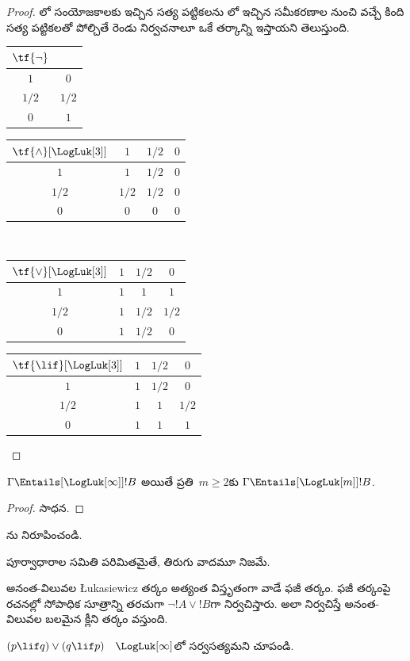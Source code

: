 \documentclass[../../../include/open-logic-section]{subfiles}
\begin{document}
\begin{proof}
  లో
   సంయోజకాలకు ఇచ్చిన సత్య పట్టికలను
   లో ఇచ్చిన సమీకరణాల నుంచి వచ్చే
   కింది సత్య పట్టికలతో పోల్చితే రెండు నిర్వచనాలూ ఒకే తర్కాన్ని ఇస్తాయని తెలుస్తుంది.
  \begin{center}
    \begin{tabular}{c|c}
      $\tf{\lnot}$ & \\
      \hline
      $1$ & $0$ \\
      $1/2$ & $1/2$ \\
      $0$ & $1$
    \end{tabular}
    \quad
    \begin{tabular}{c|ccc}
      $\tf{\land}[\LogLuk[3]]$ & $1$ & $1/2$ & $0$ \\
      \hline
      $1$ & $1$ & $1/2$ & $0$ \\
      $1/2$ & $1/2$ & $1/2$ & $0$\\
      $0$ & $0$ & $0$ & $0$
    \end{tabular}
    \\[2ex]
    \begin{tabular}{c|ccc}
      $\tf{\lor}[\LogLuk[3]]$ & $1$ & $1/2$ & $0$ \\
      \hline
      $1$ & $1$ & $1$ & $1$ \\
      $1/2$ & $1$ & $1/2$ & $1/2$ \\
      $0$ & $1$ & $1/2$ & $0$
    \end{tabular}
    \quad
    \begin{tabular}{c|ccc}
      $\tf{\lif}[\LogLuk[3]]$ & $1$ & $1/2$ & $0$ \\
      \hline
      $1$ & $1$ & $1/2$ & $0$ \\
      $1/2$ & $1$ & $1$ & $1/2$  \\
      $0$ & $1$ & $1$ & $1$
    \end{tabular}
  \end{center}
\end{proof}

\begin{prop}
  $\Gamma \Entails[\LogLuk[\infty]] !B$
  అయితే ప్రతి~$m \ge 2$కు
  $\Gamma \Entails[\LogLuk[m]] !B$.
\end{prop}

\begin{proof}
  సాధన.
\end{proof}

\begin{prob}
  ను
  నిరూపించండి.
\end{prob}

పూర్వాధారాల సమితి పరిమితమైతే, తిరుగు వాదమూ నిజమే.

అనంత-విలువల \L ukasiewicz తర్కం
అత్యంత విస్తృతంగా వాడే ఫజీ తర్కం.
ఫజీ తర్కంపై రచనల్లో సోపాధిక సూత్రాన్ని తరచుగా
$\lnot !A \lor !B$గా నిర్వచిస్తారు. అలా
నిర్వచిస్తే అనంత-విలువల బలమైన క్లీని తర్కం వస్తుంది.

\begin{prob}
  $(p \lif q) \lor (q \lif p)$
  ~$\LogLuk[\infty]$లో సర్వసత్యమని
  చూపండి.
\end{prob}
\end{document}
